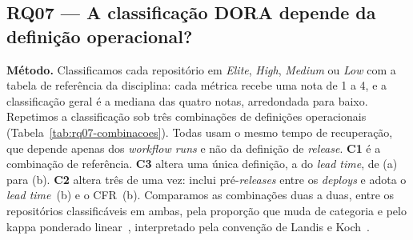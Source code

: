 %

\subsection{RQ07 --- A classifica\c{c}\~ao DORA depende da defini\c{c}\~ao operacional?}

\textbf{M\'etodo.} Classificamos cada reposit\'orio em \textit{Elite}, \textit{High},
\textit{Medium} ou \textit{Low} com a tabela de refer\^encia da disciplina: cada m\'etrica
recebe uma nota de 1 a 4, e a classifica\c{c}\~ao geral \'e a mediana das quatro notas,
arredondada para baixo. Repetimos a classifica\c{c}\~ao sob tr\^es combina\c{c}\~oes de
defini\c{c}\~oes operacionais (Tabela~\ref{tab:rq07-combinacoes}). Todas usam o mesmo tempo
de recupera\c{c}\~ao, que depende apenas dos \textit{workflow runs} e n\~ao da defini\c{c}\~ao
de \textit{release}. \textbf{C1} \'e a combina\c{c}\~ao de refer\^encia. \textbf{C3} altera uma
\'unica defini\c{c}\~ao, a do \textit{lead time}, de (a) para (b). \textbf{C2} altera tr\^es de
uma vez: inclui pr\'e-\textit{releases} entre os \textit{deploys} e adota o \textit{lead time}~(b)
e o CFR~(b). Comparamos as combina\c{c}\~oes duas a duas, entre os reposit\'orios
classific\'aveis em ambas, pela propor\c{c}\~ao que muda de categoria e pelo kappa ponderado
linear~\cite{cohen1968weighted}, interpretado pela conven\c{c}\~ao de Landis e
Koch~\cite{landis1977measurement}.

